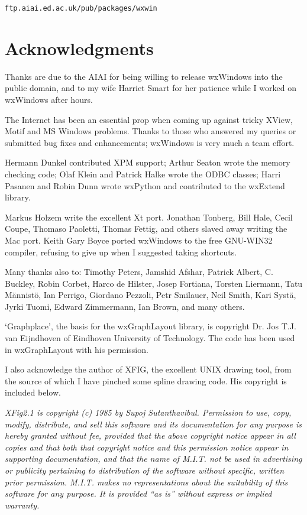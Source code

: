\begin{verbatim}
ftp.aiai.ed.ac.uk/pub/packages/wxwin
\end{verbatim}

\section{Acknowledgments}

Thanks are due to the AIAI for being willing to release wxWindows into
the public domain, and to my wife Harriet Smart for her patience while I
worked on wxWindows after hours.

The Internet has been an essential prop when coming up against tricky
XView, Motif and MS Windows problems. Thanks to those who answered my
queries or submitted bug fixes and enhancements; wxWindows is very
much a team effort.

Hermann Dunkel contributed XPM support; Arthur Seaton wrote the memory
checking code; Olaf Klein and Patrick Halke wrote the ODBC classes;
Harri Pasanen and Robin Dunn wrote wxPython and contributed to the
wxExtend library.

Markus Holzem write the excellent Xt port. Jonathan Tonberg, Bill Hale,
Cecil Coupe, Thomaso Paoletti, Thomas Fettig, and others slaved away
writing the Mac port.  Keith Gary Boyce ported wxWindows to the free
GNU-WIN32 compiler, refusing to give up when I suggested taking
shortcuts.

Many thanks also to: Timothy Peters, Jamshid Afshar, Patrick Albert, C. Buckley,
Robin Corbet, Harco de Hilster, Josep Fortiana, Torsten Liermann, Tatu
M\"{a}nnist\"{o}, Ian Perrigo, Giordano Pezzoli, Petr Smilauer, Neil Smith,
Kari Syst\"{a}, Jyrki Tuomi, Edward Zimmermann, Ian Brown, and many
others.

`Graphplace', the basis for the wxGraphLayout library, is copyright Dr. Jos
T.J. van Eijndhoven of Eindhoven University of Technology. The code has
been used in wxGraphLayout with his permission.

I also acknowledge the author of XFIG, the excellent UNIX drawing tool,
from the source of which I have pinched some spline drawing code.
His copyright is included below.

{\it XFig2.1 is copyright (c) 1985 by Supoj Sutanthavibul. Permission to
use, copy, modify, distribute, and sell this software and its
documentation for any purpose is hereby granted without fee, provided
that the above copyright notice appear in all copies and that both that
copyright notice and this permission notice appear in supporting
documentation, and that the name of M.I.T. not be used in advertising or
publicity pertaining to distribution of the software without specific,
written prior permission.  M.I.T. makes no representations about the
suitability of this software for any purpose.  It is provided ``as is''
without express or implied warranty.}

